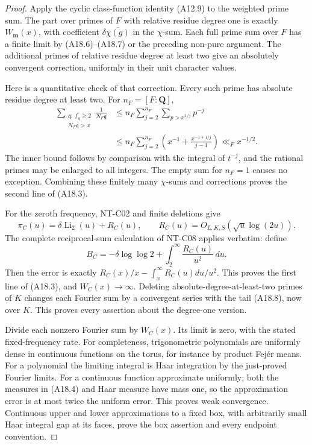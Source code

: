 \begin{proof}
Apply the cyclic class-function identity (A12.9)
to the weighted prime sum. The part over primes
of \(F\) with relative residue degree one is
exactly \(W_{\mathbf m}(x)\), with coefficient
\(\delta\overline{\chi(g)}\) in the \(\chi\)-sum.
Each full prime sum over \(F\) has a finite limit
by (A18.6)--(A18.7) or the preceding non-pure
argument. The additional primes of relative
residue degree at least two give an absolutely
convergent correction, uniformly in their unit
character values.

Here is a quantitative check of that correction.
Every such prime has absolute residue degree
at least two. For \(n_F=[F:\mathbf Q]\),
\[
 \begin{split}
 \sum_{\substack{\mathfrak q:\ f_{\mathfrak q}\ge2\\
                                   N_F\mathfrak q>x}}
                \frac1{N_F\mathfrak q}
 &\le n_F\sum_{j=2}^{n_F}\sum_{p>x^{1/j}}p^{-j}\\
 &\le n_F\sum_{j=2}^{n_F}
       \left(x^{-1}+\frac{x^{-1+1/j}}{j-1}\right)
                       \ll_F x^{-1/2}.
 \end{split}                                                   \tag{A18.8}
\]
The inner bound follows by comparison with the
integral of \(t^{-j}\), and the rational primes
may be enlarged to all integers. The empty
sum for \(n_F=1\) causes no exception.
Combining these finitely many \(\chi\)-sums and
corrections proves the second line of (A18.3).

For the zeroth frequency, NT-C02 and finite
deletions give
\[
 \pi_C(u)=\delta\operatorname{Li}_2(u)+R_C(u),
          \qquad R_C(u)=O_{L,K,S}(\sqrt u\log(2u)).
 \]
The complete reciprocal-sum calculation of
NT-C08 applies verbatim: define
\[
 B_C=-\delta\log\log2+
                             \int_2^\infty\frac{R_C(u)}{u^2}\,du .
 \]
Then the error is exactly
\(R_C(x)/x-\int_x^\infty R_C(u)du/u^2\).
This proves the first line of (A18.3), and
\(W_C(x)\to\infty\).
Deleting absolute-degree-at-least-two primes
of \(K\) changes each Fourier sum by a convergent
series with the tail (A18.8), now over \(K\).
This proves every assertion about the degree-one
version.

Divide each nonzero Fourier sum by \(W_C(x)\).
Its limit is zero, with the stated fixed-frequency
rate. For completeness, trigonometric polynomials
are uniformly dense in continuous functions on
the torus, for instance by product Fej\'er means.
For a polynomial the limiting integral is Haar
integration by the just-proved Fourier limits.
For a continuous function approximate uniformly;
both the measures in (A18.4) and Haar measure
have mass one, so the approximation error is
at most twice the uniform error. This proves
weak convergence. Continuous upper and lower
approximations to a fixed box, with arbitrarily
small Haar integral gap at its faces, prove the
box assertion and every endpoint convention.


\end{proof}
